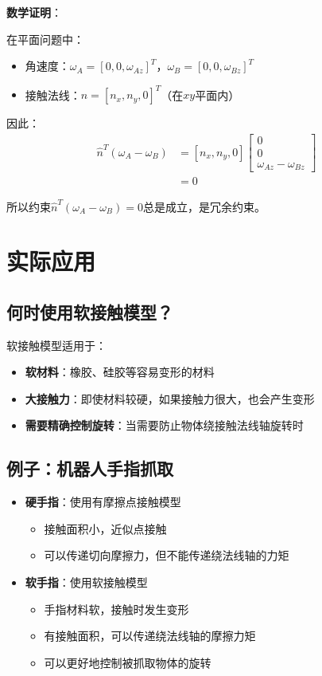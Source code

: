 \documentclass[12pt,a4paper]{article}
\begin{document}
\textbf{数学证明}：

在平面问题中：
\begin{itemize}
\item 角速度：$\omega_A = [0, 0, \omega_{Az}]^T$，$\omega_B = [0, 0, \omega_{Bz}]^T$
\item 接触法线：$\hat{n} = [n_x, n_y, 0]^T$（在$xy$平面内）
\end{itemize}

因此：
\begin{align}
\hat{n}^T (\omega_A - \omega_B) &= [n_x, n_y, 0] \begin{bmatrix} 0 \\ 0 \\ \omega_{Az} - \omega_{Bz} \end{bmatrix} \\
&= 0
\end{align}

所以约束$\hat{n}^T (\omega_A - \omega_B) = 0$总是成立，是冗余约束。

\section{实际应用}

\subsection{何时使用软接触模型？}

软接触模型适用于：
\begin{itemize}
\item \textbf{软材料}：橡胶、硅胶等容易变形的材料
\item \textbf{大接触力}：即使材料较硬，如果接触力很大，也会产生变形
\item \textbf{需要精确控制旋转}：当需要防止物体绕接触法线轴旋转时
\end{itemize}

\subsection{例子：机器人手指抓取}

\begin{itemize}
\item \textbf{硬手指}：使用有摩擦点接触模型
  \begin{itemize}
  \item 接触面积小，近似点接触
  \item 可以传递切向摩擦力，但不能传递绕法线轴的力矩
  \end{itemize}

\item \textbf{软手指}：使用软接触模型
  \begin{itemize}
  \item 手指材料软，接触时发生变形
  \item 有接触面积，可以传递绕法线轴的摩擦力矩
  \item 可以更好地控制被抓取物体的旋转
  \end{itemize}
\end{itemize}
\end{document}
